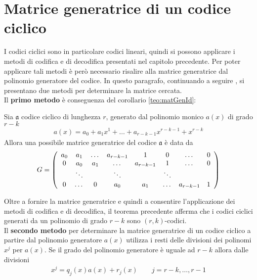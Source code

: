 \section{Matrice generatrice di un codice ciclico}
I codici ciclici sono in particolare codici lineari, quindi si possono applicare i metodi di codifica e di decodifica presentati nel capitolo precedente. Per poter applicare tali metodi è però necessario risalire alla matrice generatrice dal polinomio generatore del codice. In questo paragrafo, continuando a seguire \cite{berardi}, si presentano due metodi per determinare la matrice cercata. \\
Il {\bf primo metodo} è conseguenza del corollario \ref{teo:matGenId}:
\begin{teorema}\label{teo:ciclicoPrimoMetodo}
   Sia $\mathfrak{a}$ codice ciclico di lunghezza $r$, generato dal polinomio monico $a(x)$ di grado $r-k$
   \begin{align*}
      a(x) = a_{0} + a_{1}x^{1} + \dots + a_{r-k-1}x^{r-k-1} + x^{r-k}
   \end{align*}
   Allora una possibile matrice generatrice del codice $\mathfrak{a}$ è data da
   \begin{align*}
      G =
      \left(
      \begin{array} {c c c c c c c c}
      a_{0} & a_{1} & \dots & a_{r-k-1} & 1 & 0 & \dots & 0 \\
      0 & a_{0} & a_{1} & \dots & a_{r-k-1} & 1 & \dots & 0  \\
       & \ddots &  & \ddots &  & \ddots &  &     \\
      0 & \dots & 0 & a_{0} & a_{1} & \dots & a_{r-k-1} & 1
      \end{array}
      \right)
   \end{align*}
\end{teorema}
Oltre a  fornire la matrice generatrice e quindi a consentire l'applicazione dei metodi di codifica e di decodifica, il teorema precedente afferma che i codici ciclici generati da un polinomio di grado $r-k$ sono $(r,k)$-codici.
\\
Il {\bf secondo metodo} per determinare la matrice generatrice di un codice ciclico a partire dal polinomio generatore $a(x)$ utilizza i resti delle divisioni dei polinomi $x^{j}$ per $a(x)$. Se il grado del polinomio generatore è uguale ad $r-k$ allora dalle divisioni
\begin{align*}
   x^{j} = q_{j}(x)a(x) + r_{j}(x) \qquad j = r-k , \dots , r-1
\end{align*}
